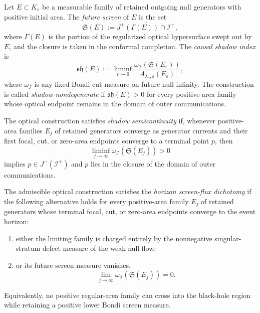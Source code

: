 \begin{definition}\label{def:CausalShadowIndex}
Let $E\subset K_\varepsilon$ be a measurable family of retained outgoing null generators with positive initial area. The \emph{future screen} of $E$ is the set
\[
    \mathfrak S(E):=\overline{J^+(\Gamma(E))\cap\mathscr I^+},
\]
where $\Gamma(E)$ is the portion of the regularized optical hypersurface swept out by $E$, and the closure is taken in the conformal completion. The \emph{causal shadow index} is
\[
    \mathfrak{sh}(E)
    :=
    \liminf_{\varepsilon\to0}
    \frac{\omega_{\mathscr I}(\mathfrak S(E_\varepsilon))}
         {A_{\lambda_0,\varepsilon}(E_\varepsilon)},
\]
where $\omega_{\mathscr I}$ is any fixed Bondi cut measure on future null infinity. The construction is called \emph{shadow-nondegenerate} if $\mathfrak{sh}(E)>0$ for every positive-area family whose optical endpoint remains in the domain of outer communications.
\end{definition}

\begin{definition}\label{def:ShadowSemicontinuity}
The optical construction satisfies \emph{shadow semicontinuity} if, whenever positive-area families $E_j$ of retained generators converge as generator currents and their first focal, cut, or zero-area endpoints converge to a terminal point $p$, then
\[
    \liminf_{j\to\infty}\omega_{\mathscr I}(\mathfrak S(E_j))>0
\]
implies $p\in J^-(\mathscr I^+)$ and $p$ lies in the closure of the domain of outer communications.
\end{definition}

\begin{definition}\label{def:HorizonScreenFluxDichotomy}
The admissible optical construction satisfies the \emph{horizon screen-flux dichotomy} if the following alternative holds for every positive-area family $E_j$ of retained generators whose terminal focal, cut, or zero-area endpoints converge to the event horizon:
\begin{enumerate}
    \item either the limiting family is charged entirely by the nonnegative singular-stratum defect measure of the weak null flow;
    \item or its future screen measure vanishes,
    \[
        \lim_{j\to\infty}\omega_{\mathscr I}(\mathfrak S(E_j))=0 .
    \]
\end{enumerate}
Equivalently, no positive regular-area family can cross into the black-hole region while retaining a positive lower Bondi screen measure.
\end{definition}


